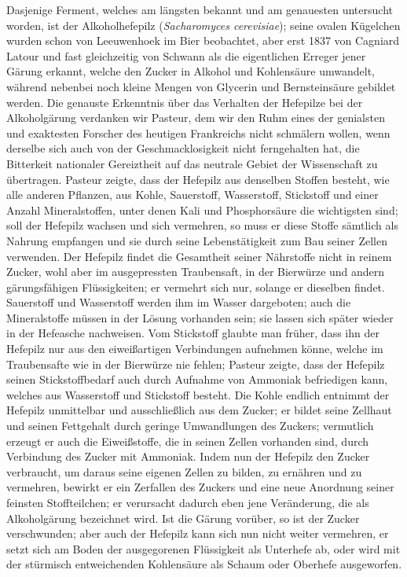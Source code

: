 \documentclass[a4paper, 11pt, oneside, english]{article}
\begin{document}
Dasjenige Ferment, welches am längsten bekannt und am genauesten untersucht worden, ist der Alkoholhefepilz (\emph{Sacharomyces cerevisiae}); seine ovalen Kügelchen wurden schon von Leeuwenhoek im Bier beobachtet, aber erst 1837 von Cagniard Latour und fast gleichzeitig von Schwann als die eigentlichen Erreger jener Gärung erkannt, welche den Zucker in Alkohol und Kohlensäure umwandelt, während nebenbei noch kleine Mengen von Glycerin und Bernsteinsäure gebildet werden. Die genauste Erkenntnis über das Verhalten der Hefepilze bei der Alkoholgärung verdanken wir Pasteur, dem wir den Ruhm eines der genialsten und exaktesten Forscher des heutigen Frankreichs nicht schmälern wollen, wenn derselbe sich auch von der Geschmacklosigkeit nicht ferngehalten hat, die Bitterkeit nationaler Gereiztheit auf das neutrale Gebiet der Wissenschaft zu übertragen. Pasteur zeigte, dass der Hefepilz aus denselben Stoffen besteht, wie alle anderen Pflanzen, aus Kohle, Sauerstoff, Wasserstoff, Stickstoff und einer Anzahl Mineralstoffen, unter denen Kali und Phosphorsäure die wichtigsten sind; soll der Hefepilz wachsen und sich vermehren, so muss er diese Stoffe sämtlich als Nahrung empfangen und sie durch seine Lebenstätigkeit zum Bau seiner Zellen verwenden. Der Hefepilz findet die Gesamtheit seiner Nährstoffe nicht in reinem Zucker, wohl aber im ausgepressten Traubensaft, in der Bierwürze und andern gärungsfähigen Flüssigkeiten; er vermehrt sich nur, solange er dieselben findet. Sauerstoff und Wasserstoff werden ihm im Wasser dargeboten; auch die Mineralstoffe müssen in der Lösung vorhanden sein; sie lassen sich später wieder in der Hefeasche nachweisen. Vom Stickstoff glaubte man früher, dass ihn der Hefepilz nur aus den eiweißartigen Verbindungen aufnehmen könne, welche im Traubensafte wie in der Bierwürze nie fehlen; Pasteur zeigte, dass der Hefepilz seinen Stickstoffbedarf auch durch Aufnahme von Ammoniak befriedigen kann, welches aus Wasserstoff und Stickstoff besteht. Die Kohle endlich entnimmt der Hefepilz unmittelbar und ausschließlich aus dem Zucker; er bildet seine Zellhaut und seinen Fettgehalt durch geringe Umwandlungen des Zuckers; vermutlich erzeugt er auch die Eiweißstoffe, die in seinen Zellen vorhanden sind, durch Verbindung des Zucker mit Ammoniak. Indem nun der Hefepilz den Zucker verbraucht, um daraus seine eigenen Zellen zu bilden, zu ernähren und zu vermehren, bewirkt er ein Zerfallen des Zuckers und eine neue Anordnung seiner feinsten Stoffteilchen; er verursacht dadurch eben jene Veränderung, die als Alkoholgärung bezeichnet wird. Ist die Gärung vorüber, so ist der Zucker verschwunden; aber auch der Hefepilz kann sich nun nicht weiter vermehren, er setzt sich am Boden der ausgegorenen Flüssigkeit als Unterhefe ab, oder wird mit der stürmisch entweichenden Kohlensäure als Schaum oder Oberhefe ausgeworfen.
\end{document}
